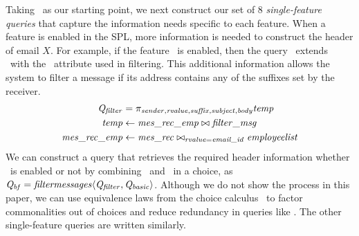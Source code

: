 Taking \Qbasic\ as our starting point, we next construct our set of $8$
\emph{single-feature queries} that capture the information needs specific to
each feature.
%
When a feature is enabled in the SPL, more information is needed to construct
the header of email $X$. For example, if the feature \filtermessages\ is
enabled, then the query \Qfilter\ extends \Qbasic\ with the \suffix\ attribute
used in filtering. This additional information allows the system to filter a
message if its address contains any of the suffixes set by the receiver.
%
%
\vspace{-2pt}
\begin{align*}
\Qfilter &= 
\projectRel{\sender,\rvalue,\suffix,\subject,\body} \temp \\
\temp & \leftarrow \mretable
 \bowtie \filtermsg \\
\mretable &\leftarrow \joinRel{\mrtable}{\employees}{\rvalue=\emailid}
\end{align*}
\vspace{-1pt}
%
%
We can construct a query that retrieves the required header information whether
\filtermessages\ is enabled or not by combining \Qbasic\ and \Qfilter\ in a
choice, as $\Qbf=\chc[\filtermessages]{\Qfilter,\Qbasic}$. 
%
Although we do not show the process in this paper, we can use equivalence laws
from the choice calculus~\cite{EW11tosem,HW16fosd} to factor commonalities out
of choices and reduce redundancy in queries like \Qbf.
The other single-feature queries are written similarly.




